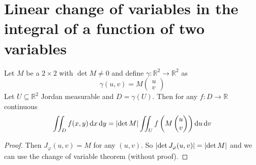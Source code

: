 \documentclass[12pt]{extarticle}
\newcommand{\R}{\mathbb{R}}
\theoremstyle{definition}
\theoremstyle{remark}
\numberwithin{equation}{section}
\begin{document}
\section{Linear change of variables in the integral of a function of two variables}

\begin{theorem}
    Let $M$ be a $2\times 2$ with $\det M \neq 0$ and define $\gamma : \R^2 \to \R^2$ as
    \begin{equation}
        \gamma(u, v) = M \begin{pmatrix}
            u \\ v
        \end{pmatrix}
    \end{equation}
    Let $U \subseteq \R^2$ Jordan measurable and $D = \gamma(U)$.
    Then for any $f: D \to \R$ continuous
    \begin{equation}
        \iint_D f(x, y) \dd{x}\dd{y} = \abs{\det M} \iint_U f\left(M\begin{pmatrix} u \\ v\end{pmatrix}\right) \dd{u} \dd{v}
    \end{equation}
\end{theorem}

\begin{proof}
    Then $J_\varphi(u, v) = M$ for any $(u, v)$.
    So $\abs{\det J_\varphi (u, v)} = \abs{\det M}$ and we can use the change of variable theorem (without proof).
\end{proof}
\end{document}
